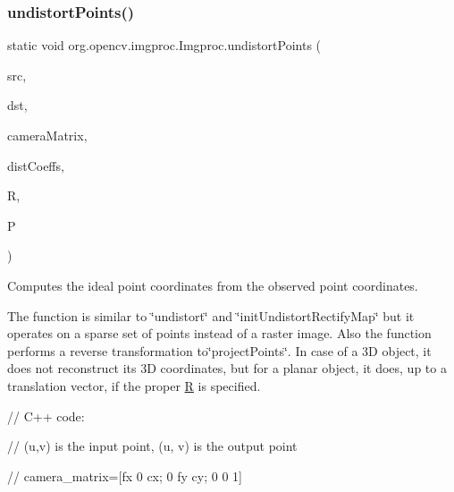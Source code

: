 \subsubsection{\texorpdfstring{undistort\+Points()}{undistortPoints()}\hspace{0.1cm}{\footnotesize\ttfamily [1/2]}}
{\footnotesize\ttfamily static void org.\+opencv.\+imgproc.\+Imgproc.\+undistort\+Points (\begin{DoxyParamCaption}\item[{\mbox{\hyperlink{classorg_1_1opencv_1_1core_1_1_mat_of_point2f}{Mat\+Of\+Point2f}}}]{src,  }\item[{\mbox{\hyperlink{classorg_1_1opencv_1_1core_1_1_mat_of_point2f}{Mat\+Of\+Point2f}}}]{dst,  }\item[{\mbox{\hyperlink{classorg_1_1opencv_1_1core_1_1_mat}{Mat}}}]{camera\+Matrix,  }\item[{\mbox{\hyperlink{classorg_1_1opencv_1_1core_1_1_mat}{Mat}}}]{dist\+Coeffs,  }\item[{\mbox{\hyperlink{classorg_1_1opencv_1_1core_1_1_mat}{Mat}}}]{R,  }\item[{\mbox{\hyperlink{classorg_1_1opencv_1_1core_1_1_mat}{Mat}}}]{P }\end{DoxyParamCaption})\hspace{0.3cm}{\ttfamily [static]}}

Computes the ideal point coordinates from the observed point coordinates.

The function is similar to \char`\"{}undistort\char`\"{} and \char`\"{}init\+Undistort\+Rectify\+Map\char`\"{} but it operates on a sparse set of points instead of a raster image. Also the function performs a reverse transformation to\char`\"{}project\+Points\char`\"{}. In case of a 3D object, it does not reconstruct its 3D coordinates, but for a planar object, it does, up to a translation vector, if the proper {\ttfamily \mbox{\hyperlink{classorg_1_1opencv_1_1_r}{R}}} is specified. {\ttfamily }

{\ttfamily }

{\ttfamily }

{\ttfamily // C++ code\+:}

{\ttfamily }

{\ttfamily }

{\ttfamily // (u,v) is the input point, (u\textquotesingle{}, v\textquotesingle{}) is the output point}

{\ttfamily }

{\ttfamily }

{\ttfamily // camera\+\_\+matrix=\mbox{[}fx 0 cx; 0 fy cy; 0 0 1\mbox{]}}

